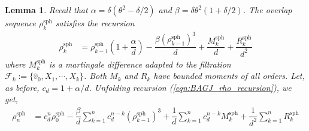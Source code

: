 \documentclass[12pt]{article}
\newtheorem{lemma}[theorem]{Lemma}      %
\newcommand{\sph}{\text{sph}}
\def\gF{{\mathcal{F}}}
\begin{document}
\medskip

\begin{lemma}\label{lemma:BAGJ_recursion}
    Recall that $\alpha = \delta(\theta^2-\delta/2)$ and $\beta = \delta\theta^2(1+\delta/2)$. The overlap sequence $\rho^\sph_k$ satisfies the recursion
    \begin{align}\label{eqn:BAGJ_rho_recursion}
        \rho_k^\sph &= \rho_{k-1}^\sph\left(1+\dfrac{\alpha}{d}\right) - \dfrac{\beta(\rho_{k-1}^\sph)^3}{d}+\dfrac{M_k^\sph}{d} + \dfrac{R_k^\sph}{d^2}
    \end{align}where $M_k^\sph$ is a martingale difference adapted to the filtration $\gF_k:=\{\hat v_0,X_1,\cdots, X_k\}$. Both $M_k$ and $R_k$ have bounded moments of all orders. Let, as before, $c_d=1+\alpha/d$. Unfolding recursion (\ref{eqn:BAGJ_rho_recursion}), we get,
    \begin{align}\label{eqn:BAGJ_rho_recursion_unfolded}
      \rho_n^\sph &= c_d^n\rho_0^\sph - \dfrac{\beta}{d}\sum_{k=1}^n c_d^{n-k}(\rho_{k-1}^\sph)^3 + \dfrac{1}{d}\sum_{k=1}^n c_d^{n-k}M^\sph_k + \dfrac{1}{d^2}\sum_{k=1}^n R^\sph_k
    \end{align}
\end{lemma}

\medskip
\end{document}
